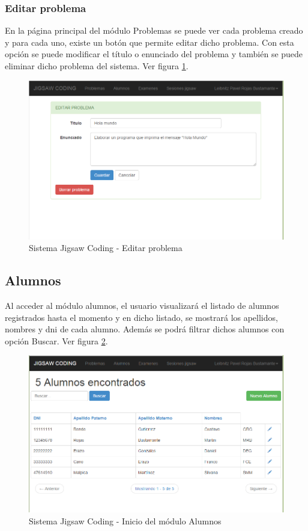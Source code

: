 \subsubsection{Editar problema}
En la página principal del módulo Problemas se puede ver cada problema creado y para cada uno, existe un botón que permite editar dicho problema. Con esta opción se puede modificar el título o enunciado del problema y también se puede eliminar dicho problema del sistema. Ver figura \ref{fig:problemas_editar}.

\begin{figure}[h!]
\centering
\caption[SJC Editar problema]{Sistema Jigsaw Coding - Editar problema}
\label{fig:problemas_editar}
\includegraphics[scale=0.5]{figuras/usodelsistema/docente/problemas_editar}
\end{figure}

\subsection{Alumnos}
Al acceder al módulo alumnos, el usuario visualizará el listado de alumnos registrados hasta el momento y en dicho listado, se mostrará los apellidos, nombres y dni de cada alumno. Además se podrá filtrar dichos alumnos con opción Buscar. Ver figura \ref{fig:alumnos_inicio}.

\begin{figure}[h!]
	\centering
	\caption[SJC Alumnos]{Sistema Jigsaw Coding - Inicio del módulo Alumnos}
	\label{fig:alumnos_inicio}
	\includegraphics[scale=0.5]{figuras/usodelsistema/docente/alumnos_inicio}
\end{figure}

